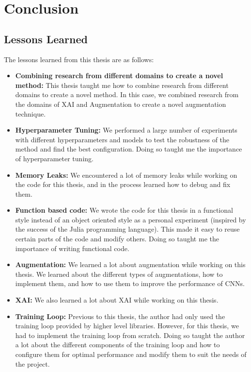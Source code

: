 \chapter{Conclusion} \label{ch:conclusion}

\section{Lessons Learned}
The lessons learned from this thesis are as follows:
\begin{itemize}
    \item \textbf{Combining research from different domains to create a novel method: } This thesis taught me how to combine research from different domains to create a novel method. In this case, we combined research from the domains of XAI and Augmentation to create a novel augmentation technique.
    \item \textbf{Hyperparameter Tuning: } We performed a large number of experiments with different hyperparameters and models to test the robustness of the method and find the best configuration. Doing so taught me the importance of hyperparameter tuning.
    \item \textbf{Memory Leaks: }We encountered a lot of memory leaks while working on the code for this thesis, and in the process learned how to debug and fix them. 
    \item \textbf{Function based code: }We wrote the code for this thesis in a functional style instead of an object oriented style as a personal experiment (inspired by the success of the Julia programming language). This made it easy to reuse certain parts of the code and modify others. Doing so taught me the importance of writing functional code.
    \item \textbf{Augmentation: }We learned a lot about augmentation while working on this thesis. We learned about the different types of augmentations, how to implement them, and how to use them to improve the performance of CNNs.
    \item \textbf{XAI: }We also learned a lot about XAI while working on this thesis. 
    \item \textbf{Training Loop: } Previous to this thesis, the author had only used the training loop provided by higher level libraries. However, for this thesis, we had to implement the training loop from scratch. Doing so taught the author a lot about the different components of the training loop and how to configure them for optimal performance and modify them to suit the needs of the project.
\end{itemize}

